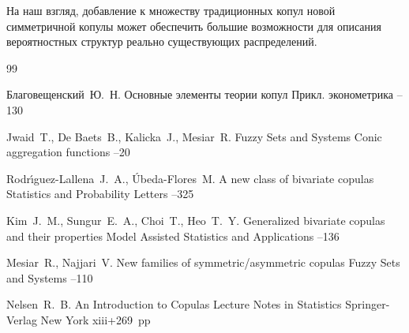 На наш взгляд, добавление к множеству  традиционных копул новой симметричной копулы может обеспечить  большие возможности для описания вероятностных структур реально существующих распределений.







\begin{thebibliography}{99}  %

\by Благовещенский~Ю.~Н.
\paper Основные элементы теории копул
\jour  Прикл. эконометрика 
--130 

\by Jwaid~T., De Baets~B., Kalicka~J., Mesiar~R.
\jour Fuzzy Sets and Systems
\paper Conic aggregation functions
–20 

\by Rodr\'{\i}guez-Lallena~J.~A., \'Ubeda-Flores~M. 
\paper A new class of bivariate copulas
\jour Statistics and Probability Letters
--325 



\by Kim~J.~M., Sungur~E.~A., Choi~T., Heo~T.~Y.
\paper Generalized bivariate copulas and their properties
\jour Model Assisted Statistics and Applications
--136

\by Mesiar~R., Najjari~V.
\paper New families of symmetric/asymmetric copulas
\jour Fuzzy Sets and Systems 
–110 

\by Nelsen~R.~B. 
\book An Introduction to Copulas
\serial Lecture Notes in Statistics
\publ Springer-Verlag
\publaddr New York
\totalpages xiii+269~pp \nofrills
{}



\end{thebibliography}
